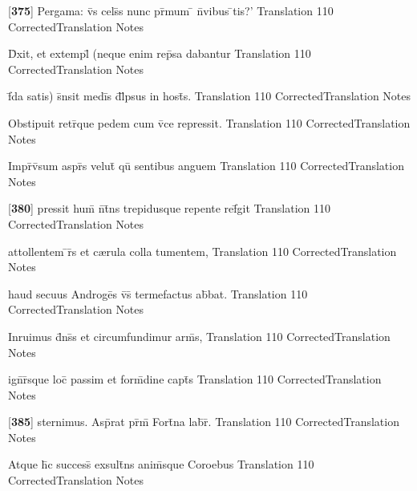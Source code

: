 \latline
  {[\textbf{375}] Pergama:  v\={}s cels\={\macron {\i}}s nunc pr\={\macron {\i}}mum \={} n\={}vibus \={\macron {\i}}tis?'}
  { Translation }
  {110}
  { CorrectedTranslation }
  { Notes }


\latline
  {D\={\macron {\i}}xit, et extempl\={} (neque enim rep\={}sa dabantur}
  { Translation }
  {110}
  { CorrectedTranslation }
  { Notes }


\latline
  {f\={\macron {\i}}da satis) s\={}nsit medi\={}s d\={}l\={}psus in host\={\macron {\i}}s.}
  { Translation }
  {110}
  { CorrectedTranslation }
  { Notes }


\latline
  {Obstipuit retr\={}que pedem cum v\={}ce repressit.}
  { Translation }
  {110}
  { CorrectedTranslation }
  { Notes }


\latline
  {Impr\={}v\={\macron {\i}}sum aspr\={\macron {\i}}s velut\={\macron {\i}} qu\={\macron {\i}} sentibus anguem}
  { Translation }
  {110}
  { CorrectedTranslation }
  { Notes }


\latline
  {[\textbf{380}] pressit hum\={\macron {\i}} n\={\macron {\i}}t\={}ns trepidusque repente ref\={}git}
  { Translation }
  {110}
  { CorrectedTranslation }
  { Notes }


\latline
  {attollentem \={\macron {\i}}r\={}s et c{\ae}rula colla tumentem,}
  { Translation }
  {110}
  { CorrectedTranslation }
  { Notes }


\latline
  {haud secuus Androge\={}s v\={\macron {\i}}s\={} termefactus ab\={\macron {\i}}bat.}
  { Translation }
  {110}
  { CorrectedTranslation }
  { Notes }


\latline
  {Inruimus d\={}ns\={\macron {\i}}s et circumfundimur arm\={\macron {\i}}s,}
  { Translation }
  {110}
  { CorrectedTranslation }
  { Notes }


\latline
  {ign\={}r\={}sque loc\={\macron {\i}} passim et form\={\macron {\i}}dine capt\={}s}
  { Translation }
  {110}
  { CorrectedTranslation }
  { Notes }


\latline
  {[\textbf{385}] sternimus.  Asp\={\macron {\i}}rat pr\={\macron {\i}}m\={} Fort\={}na lab\={}r\={\macron {\i}}.}
  { Translation }
  {110}
  { CorrectedTranslation }
  { Notes }


\latline
  {Atque h\={\macron {\i}}c success\={} exsult\={}ns anim\={\macron {\i}}sque Coroebus}
  { Translation }
  {110}
  { CorrectedTranslation }
  { Notes }


